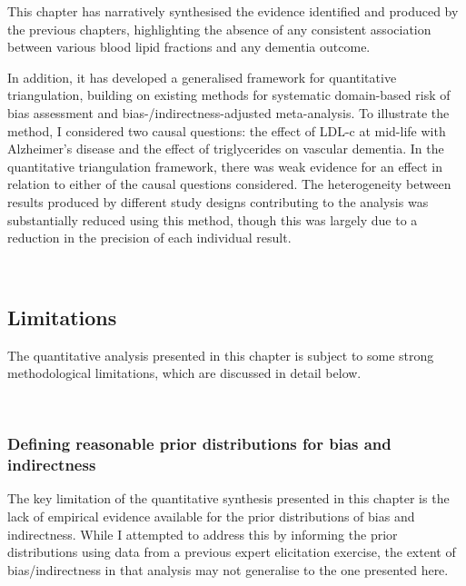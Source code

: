 \documentclass[a4paper, twoside]{templates/ociamthesis}
\begin{document}
This chapter has narratively synthesised the evidence identified and produced by the previous chapters, highlighting the absence of any consistent association between various blood lipid fractions and any dementia outcome.

In addition, it has developed a generalised framework for quantitative triangulation, building on existing methods for systematic domain-based risk of bias assessment and bias-/indirectness-adjusted meta-analysis. To illustrate the method, I considered two causal questions: the effect of LDL-c at mid-life with Alzheimer's disease and the effect of triglycerides on vascular dementia. In the quantitative triangulation framework, there was weak evidence for an effect in relation to either of the causal questions considered. The heterogeneity between results produced by different study designs contributing to the analysis was substantially reduced using this method, though this was largely due to a reduction in the precision of each individual result.

~

\hypertarget{limitations-2}{%
\subsection{Limitations}\label{limitations-2}}

The quantitative analysis presented in this chapter is subject to some strong methodological limitations, which are discussed in detail below.

~

\hypertarget{tri-prior-def}{%
\subsubsection{Defining reasonable prior distributions for bias and indirectness}\label{tri-prior-def}}

The key limitation of the quantitative synthesis presented in this chapter is the lack of empirical evidence available for the prior distributions of bias and indirectness. While I attempted to address this by informing the prior distributions using data from a previous expert elicitation exercise, the extent of bias/indirectness in that analysis may not generalise to the one presented here.
\end{document}

